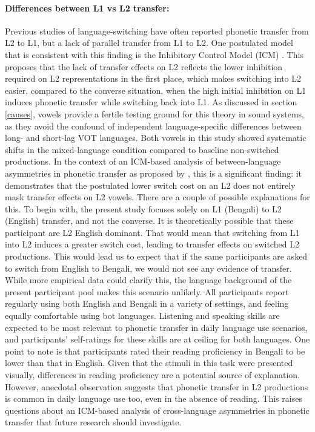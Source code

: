 \documentclass[12 pt]{article}
\begin{document}
\paragraph{Differences between L1 vs L2 transfer:}
Previous studies of language-switching have often reported phonetic transfer from L2 to L1, but a lack of parallel transfer from L1 to L2. One postulated model that is consistent with this finding is the Inhibitory Control Model (ICM) \cite{green1986control,olson2013bilingual,tsui2019impact}. This proposes that the lack of transfer effects on L2 reflects the lower inhibition required on L2 representations in the first place, which makes switching into L2 easier, compared to the converse situation, when the high initial inhibition on L1 induces phonetic transfer while switching back into L1.  As discussed in section \ref{causes}, vowels provide a fertile testing ground for this theory in sound systems, as they avoid the confound of independent language-specific differences between long- and short-lag VOT languages. Both vowels in this study showed systematic shifts in the mixed-language condition compared to baseline non-switched productions. In the context of an ICM-based analysis of between-language asymmetries in phonetic transfer as proposed by \cite{olson2013bilingual}, this is a significant finding: it demonstrates that the postulated lower switch cost on an L2 does not entirely mask transfer effects on L2 vowels. There are a couple of possible explanations for this. To begin with, the present study focuses solely on L1 (Bengali) to L2 (English) transfer, and not the converse. It is theoretically possible that these participant are L2 English dominant. That would mean that switching from L1 into L2 induces a greater switch cost, leading to transfer effects on switched L2 productions. This would lead us to expect that if the same participants are asked to switch from English to Bengali, we would not see any evidence of transfer. While more empirical data could clarify this, the language background of the present participant pool makes this scenario unlikely. All participants report regularly using both English and Bengali in a variety of settings, and feeling equally comfortable using bot languages. Listening and speaking skills are expected to be most relevant to phonetic transfer in daily language use scenarios, and participants' self-ratings for these skills are at ceiling for both languages. One point to note is that participants rated their reading proficiency in Bengali to be lower than that in English. Given that the stimuli in this task were presented visually, differences in reading proficiency are a potential source of explanation. However, anecdotal observation suggests that phonetic transfer in L2 productions is common in daily language use too, even in the absence of reading. This raises questions about an ICM-based analysis of cross-language asymmetries in phonetic transfer that future research should investigate.
\end{document}
